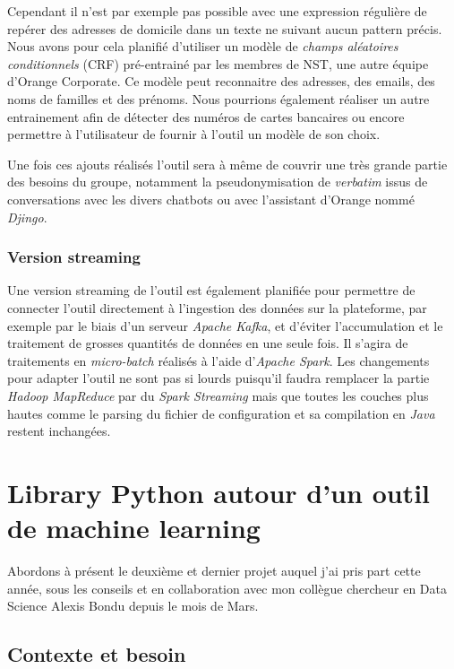 \documentclass[12pt]{report}
\begin{document}
	Cependant il n'est par exemple pas possible avec une expression régulière de repérer des adresses de domicile dans un texte ne suivant aucun pattern précis. Nous avons pour cela planifié d'utiliser un modèle de \textit{champs aléatoires conditionnels} (CRF) pré-entrainé par les membres de NST, une autre équipe d'Orange Corporate. Ce modèle peut reconnaitre des adresses, des emails, des noms de familles et des prénoms. Nous pourrions également réaliser un autre entrainement afin de détecter des numéros de cartes bancaires ou encore permettre à l'utilisateur de fournir à l'outil un modèle de son choix.
	
	Une fois ces ajouts réalisés l'outil sera à même de couvrir une très grande partie des besoins du groupe, notamment la pseudonymisation de \textit{verbatim} issus de conversations avec les divers chatbots ou avec l'assistant d'Orange nommé \textit{Djingo}.
	
	\subsection{Version streaming}
	Une version streaming de l'outil est également planifiée pour permettre de connecter l'outil directement à l'ingestion des données sur la plateforme, par exemple par le biais d'un serveur \textit{Apache Kafka}, et d’éviter l'accumulation et le traitement de grosses quantités de données en une seule fois. Il s'agira de traitements en \textit{micro-batch} réalisés à l'aide d'\textit{Apache Spark}. Les changements pour adapter l'outil ne sont pas si lourds puisqu'il faudra remplacer la partie \textit{Hadoop MapReduce} par du \textit{Spark Streaming} mais que toutes les couches plus hautes comme le parsing du fichier de configuration et sa compilation en \textit{Java} restent inchangées.
	\newpage
	\chapter{Library Python autour d'un outil de machine learning}
	Abordons à présent le deuxième et dernier projet auquel j'ai pris part cette année, sous les conseils et en collaboration avec mon collègue chercheur en Data Science Alexis Bondu depuis le mois de Mars.
	\section{Contexte et besoin}
\end{document}
